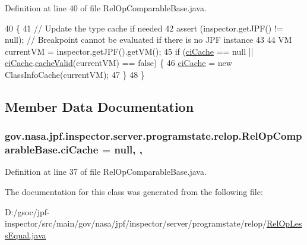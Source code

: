Definition at line 40 of file Rel\+Op\+Comparable\+Base.\+java.


\begin{DoxyCode}
40                                                                \{
41     \textcolor{comment}{// Update the type cache if needed}
42     assert (inspector.getJPF() != null); \textcolor{comment}{// Breakpoint cannot be evaluated if there is no JPF instance}
43 
44     VM currentVM = inspector.getJPF().getVM();
45     \textcolor{keywordflow}{if} (\hyperlink{classgov_1_1nasa_1_1jpf_1_1inspector_1_1server_1_1programstate_1_1relop_1_1_rel_op_comparable_base_a3bd22b88a44dff54d68b1d8a3e8f3d0a}{ciCache} == null || \hyperlink{classgov_1_1nasa_1_1jpf_1_1inspector_1_1server_1_1programstate_1_1relop_1_1_rel_op_comparable_base_a3bd22b88a44dff54d68b1d8a3e8f3d0a}{ciCache}.\hyperlink{classgov_1_1nasa_1_1jpf_1_1inspector_1_1utils_1_1_class_info_cache_ac71fb1624b72457166c1326d44fb50c5}{cacheValid}(currentVM) == \textcolor{keyword}{false}) \{
46       \hyperlink{classgov_1_1nasa_1_1jpf_1_1inspector_1_1server_1_1programstate_1_1relop_1_1_rel_op_comparable_base_a3bd22b88a44dff54d68b1d8a3e8f3d0a}{ciCache} = \textcolor{keyword}{new} ClassInfoCache(currentVM);
47     \}
48   \}
\end{DoxyCode}


\subsection{Member Data Documentation}
\subsubsection[{\texorpdfstring{ci\+Cache}{ciCache}}]{ gov.\+nasa.\+jpf.\+inspector.\+server.\+programstate.\+relop.\+Rel\+Op\+Comparable\+Base.\+ci\+Cache = null\hspace{0.3cm}{\ttfamily [static]}, {\ttfamily [protected]}, {\ttfamily [inherited]}}\hypertarget{classgov_1_1nasa_1_1jpf_1_1inspector_1_1server_1_1programstate_1_1relop_1_1_rel_op_comparable_base_a3bd22b88a44dff54d68b1d8a3e8f3d0a}{}\label{classgov_1_1nasa_1_1jpf_1_1inspector_1_1server_1_1programstate_1_1relop_1_1_rel_op_comparable_base_a3bd22b88a44dff54d68b1d8a3e8f3d0a}


Definition at line 37 of file Rel\+Op\+Comparable\+Base.\+java.



The documentation for this class was generated from the following file\+:\begin{DoxyCompactItemize}
\item 
D\+:/gsoc/jpf-\/inspector/src/main/gov/nasa/jpf/inspector/server/programstate/relop/\hyperlink{_rel_op_less_equal_8java}{Rel\+Op\+Less\+Equal.\+java}\end{DoxyCompactItemize}
